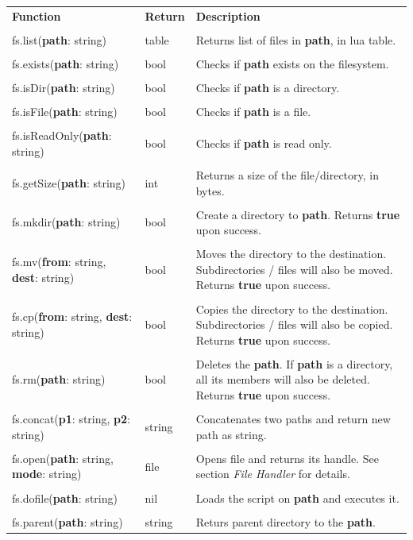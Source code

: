 \documentclass[10pt, stock]{memoir}
\begin{document}
\begin{tabularx}{\textwidth}{l l X}
	\textbf{\large Function} & \textbf{\large Return} & \textbf{\large Description}
	\\ \\
	\endhead
	fs.list(\textbf{path}: string) & table & Returns list of files in \textbf{path}, in lua table.
	\\ \\
	fs.exists(\textbf{path}: string) & bool & Checks if \textbf{path} exists on the filesystem.
	\\ \\
	fs.isDir(\textbf{path}: string) & bool & Checks if \textbf{path} is a directory.
	\\ \\
	fs.isFile(\textbf{path}: string) & bool & Checks if \textbf{path} is a file.
	\\ \\
	fs.isReadOnly(\textbf{path}: string) & bool & Checks if \textbf{path} is read only.
	\\ \\
	fs.getSize(\textbf{path}: string) & int & Returns a size of the file/directory, in bytes.
	\\ \\
	fs.mkdir(\textbf{path}: string) & bool & Create a directory to \textbf{path}. Returns \textbf{true} upon success.
	\\ \\
	fs.mv(\textbf{from}: string, \textbf{dest}: string) & bool & Moves the directory to the destination. Subdirectories / files will also be moved. Returns \textbf{true} upon success.
	\\ \\
	fs.cp(\textbf{from}: string, \textbf{dest}: string) & bool & Copies the directory to the destination. Subdirectories / files will also be copied. Returns \textbf{true} upon success.
	\\ \\
	fs.rm(\textbf{path}: string) & bool & Deletes the \textbf{path}. If \textbf{path} is a directory, all its members will also be deleted. Returns \textbf{true} upon success.
	\\ \\
	fs.concat(\textbf{p1}: string, \textbf{p2}: string) & string & Concatenates two paths and return new path as string.
	\\ \\
	fs.open(\textbf{path}: string, \textbf{mode}: string) & file & Opens file and returns its handle. See section \emph{File Handler} for details.
	\\ \\
	fs.dofile(\textbf{path}: string) & nil & Loads the script on \textbf{path} and executes it.
	\\ \\
	fs.parent(\textbf{path}: string) & string & Returs parent directory to the \textbf{path}.
\end{tabularx}
\end{document}
